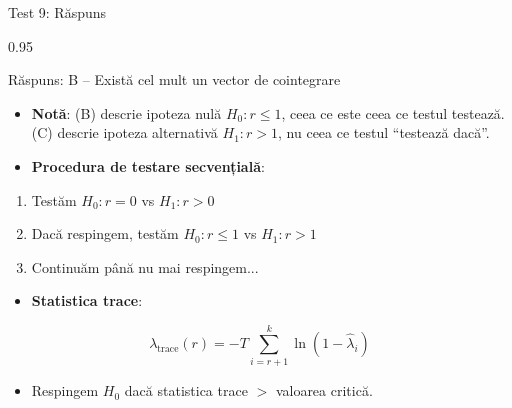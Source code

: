 \documentclass[9pt, aspectratio=169, t]{beamer}
\begin{document}
\begin{frame}{Test 9: Răspuns}
    \begin{cminipage}{0.95\textwidth}
    \begin{exampleblock}{Răspuns: B -- Există cel mult un vector de cointegrare}
        {\footnotesize
        \begin{itemize}\setlength{\itemsep}{0pt}
            \item \textbf{Notă}: (B) descrie ipoteza nulă $H_0: r \leq 1$, ceea ce este ceea ce testul testează. (C) descrie ipoteza alternativă $H_1: r > 1$, nu ceea ce testul ``testează dacă''.
        \end{itemize}
        }

        \vspace{0.2cm}
        \begin{itemize}\setlength{\itemsep}{0pt}
            \item \textbf{Procedura de testare secvențială}:
        \end{itemize}
        \begin{enumerate}\setlength{\itemsep}{0pt}
            \item Testăm $H_0: r = 0$ vs $H_1: r > 0$
            \item Dacă respingem, testăm $H_0: r \leq 1$ vs $H_1: r > 1$
            \item Continuăm până nu mai respingem...
        \end{enumerate}

        \vspace{0.2cm}
        \begin{itemize}\setlength{\itemsep}{0pt}
            \item \textbf{Statistica trace}:
        \end{itemize}
        $$\lambda_{\text{trace}}(r) = -T \sum_{i=r+1}^{k} \ln(1 - \hat{\lambda}_i)$$

        \begin{itemize}\setlength{\itemsep}{0pt}
            \item Respingem $H_0$ dacă statistica trace $>$ valoarea critică.
        \end{itemize}
    \end{exampleblock}
    \end{cminipage}
\end{frame}
\end{document}
